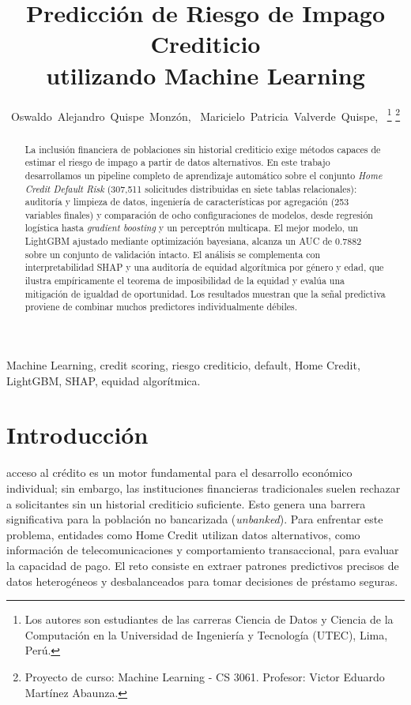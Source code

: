 \documentclass[journal]{IEEEtran}
\begin{document}
\title{Predicción de Riesgo de Impago Crediticio\\ utilizando Machine Learning}

\author{Oswaldo~Alejandro~Quispe~Monzón,~
        Maricielo~Patricia~Valverde~Quispe,~
\thanks{Los autores son estudiantes de las carreras Ciencia de Datos y Ciencia de la Computación en la Universidad de Ingeniería y Tecnología (UTEC), Lima, Perú.}
\thanks{Proyecto de curso: Machine Learning - CS 3061. Profesor: Victor Eduardo Martínez Abaunza.}}

\maketitle

\begin{abstract}
La inclusión financiera de poblaciones sin historial crediticio exige métodos capaces de estimar el riesgo de impago a partir de datos alternativos. En este trabajo desarrollamos un pipeline completo de aprendizaje automático sobre el conjunto \textit{Home Credit Default Risk} (307{,}511 solicitudes distribuidas en siete tablas relacionales): auditoría y limpieza de datos, ingeniería de características por agregación (253 variables finales) y comparación de ocho configuraciones de modelos, desde regresión logística hasta \textit{gradient boosting} y un perceptrón multicapa. El mejor modelo, un LightGBM ajustado mediante optimización bayesiana, alcanza un AUC de 0.7882 sobre un conjunto de validación intacto. El análisis se complementa con interpretabilidad SHAP y una auditoría de equidad algorítmica por género y edad, que ilustra empíricamente el teorema de imposibilidad de la equidad y evalúa una mitigación de igualdad de oportunidad. Los resultados muestran que la señal predictiva proviene de combinar muchos predictores individualmente débiles.
\end{abstract}

\begin{IEEEkeywords}
Machine Learning, credit scoring, riesgo crediticio, default, Home Credit, LightGBM, SHAP, equidad algorítmica.
\end{IEEEkeywords}

\section{Introducción}

 acceso al crédito es un motor fundamental para el desarrollo económico individual; sin embargo, las instituciones financieras tradicionales suelen rechazar a solicitantes sin un historial crediticio suficiente. Esto genera una barrera significativa para la población no bancarizada (\textit{unbanked}). Para enfrentar este problema, entidades como Home Credit utilizan datos alternativos, como información de telecomunicaciones y comportamiento transaccional, para evaluar la capacidad de pago. El reto consiste en extraer patrones predictivos precisos de datos heterogéneos y desbalanceados para tomar decisiones de préstamo seguras.
\end{document}
